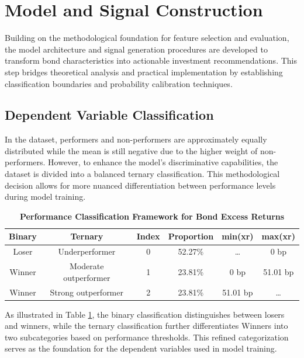 \section{Model and Signal Construction}
\label{sec:model_signal_construction}

Building on the methodological foundation for feature selection and evaluation, the model architecture and signal generation procedures are developed to transform bond characteristics into actionable investment recommendations. This step bridges theoretical analysis and practical implementation by establishing classification boundaries and probability calibration techniques.

\subsection{Dependent Variable Classification}

In the dataset, performers and non-performers are approximately equally distributed while the mean is still negative due to the higher weight of non-performers. However, to enhance the model's discriminative capabilities, the dataset is divided into a balanced ternary classification. This methodological decision allows for more nuanced differentiation between performance levels during model training.

\begin{table}[h]
\centering
\small
\begin{tabular}{cccccc}\toprule
\textbf{Binary} & \textbf{Ternary} & \textbf{Index} & \textbf{Proportion} & \textbf{min(xr)} & \textbf{max(xr)} \\\midrule
Loser & Underperformer & 0 & 52.27\% & \ldots & 0 bp \\
Winner & Moderate outperformer & 1 & 23.81\% & 0 bp & 51.01 bp \\
Winner & Strong outperformer & 2 & 23.81\% & 51.01 bp & \ldots \\ \bottomrule
\end{tabular}
\caption{\textbf{Performance Classification Framework for Bond Excess Returns}}
\label{tab:performance_classification}
\end{table}

As illustrated in Table \ref{tab:performance_classification}, the binary classification distinguishes between losers and winners, while the ternary classification further differentiates Winners into two subcategories based on performance thresholds. This refined categorization serves as the foundation for the dependent variables used in model training.

